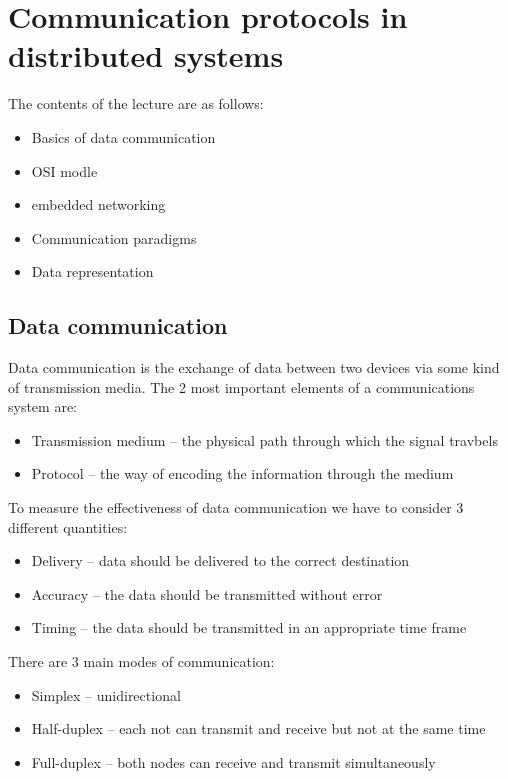 
\chapter{Communication protocols in distributed systems}
The contents of the lecture are as follows:
\begin{itemize}
    \item Basics of data communication
    \item OSI modle
    \item embedded networking
    \item Communication paradigms
    \item Data representation
\end{itemize}

\section{Data communication}
{
    Data communication is the exchange of data between two devices via some kind of transmission media.
    The 2 most important elements of a communications system are:
    \begin{itemize}
        \item Transmission medium -- the physical path through which the signal travbels
        \item Protocol -- the way of encoding the information through the medium
    \end{itemize}
}
To measure the effectiveness of data communication we have to consider 3 different quantities:
\begin{itemize}
    \item Delivery -- data should be delivered to the correct destination
    \item Accuracy -- the data should be transmitted without error
    \item Timing -- the data should be transmitted in an appropriate time frame
\end{itemize}
There are 3 main modes of communication:
\begin{itemize}
    \item Simplex -- unidirectional
    \item Half-duplex -- each not can transmit and receive but not at the same time
    \item Full-duplex -- both nodes can receive and transmit simultaneously
\end{itemize}

